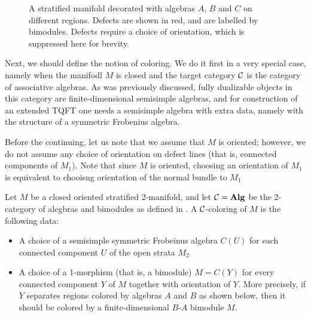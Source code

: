 \begin{defectfiguresetup}
\begin{figure}[ht]
	\caption{A stratified manifold decorated with algebras $A$, $B$ and $C$ on
	different regions. Defects are shown in red, and are labelled by bimodules.
	Defects require a choice of orientation, which is suppressed here for
	brevity.}
	\label{f:stratified_pretzel}
\end{figure}

Next, we should define the notion of coloring. We do it first in a very special
case, namely when the manifodl $M$ is closed and the target category $\mathcal{C}$ is
the category of associative algebras. As was previously discussed, fully
dualizable objects in this category are finite-dimensional semisimple algebras,
and for construction of an extended TQFT one needs a semisimple algebra with
extra data, namely with the structure of a symmetric Frobenius algebra.

Before the continuing, let us note that we assume that $M$ is oriented;
however, we do not assume any choice of orientation on defect lines (that is,
connected components of $M_1$). Note that since $M$ is oriented, choosing an
orientation of $M_1$ is equivalent to chooisng orientation of the normal bundle
to $M_1$

\begin{definition}\label{d:defect-coloring}
  Let $M$ be a closed oriented stratified 2-manifold, and let $\mathcal{C}=\mathbf{Alg}$ be
  the 2-category of alegbras and bimodules as defined in . A
  $\mathcal{C}$-coloring of $M$ is the following data:
  \begin{itemize}
    \item A choice of a semisimple symmetric Frobeinus algebra $C(U)$ for each
    connected component $U$ of the open strata $M_2$

    \item A choice of a 1-morphism (that is, a bimodule) $M=C(Y)$ for every
    connected component $Y$ of $M$ together with orientation of $Y$. More
    precisely, if $Y$ separates regions colored by algebras $A$ and $B$ as
    shown below, then it should be colored by a finite-dimensional  $B$-$A$
    bimodule $M$.


\end{itemize}
\end{definition}
\end{defectfiguresetup}
